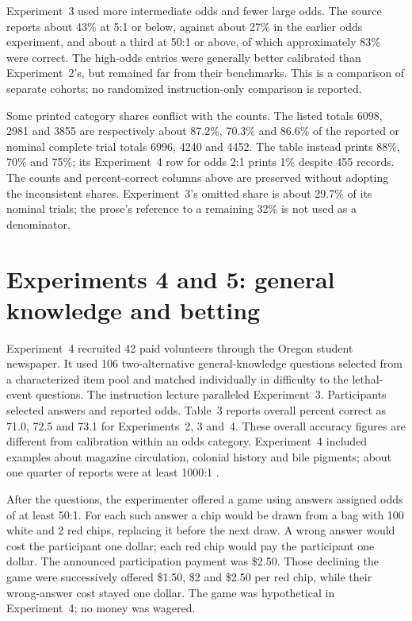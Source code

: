 Experiment~3 used more intermediate odds and fewer large odds. The source
reports about 43\% at 5:1 or below, against about 27\% in the earlier
odds experiment, and about a third at 50:1 or above, of which approximately
83\% were correct. The high-odds entries were generally better calibrated
than Experiment~2's, but remained far from their benchmarks. This is a
comparison of separate cohorts; no randomized instruction-only comparison
is reported.

Some printed category shares conflict with the counts. The listed totals
6098, 2981 and 3855 are respectively about 87.2\%, 70.3\% and 86.6\%
of the reported or nominal complete trial totals 6996, 4240 and 4452.
The table instead prints 88\%, 70\% and 75\%; its Experiment~4 row
for odds 2:1 prints 1\% despite 455 records. The counts and percent-correct
columns above are preserved without adopting the inconsistent shares.
Experiment~3's omitted share is about 29.7\% of its nominal trials;
the prose's reference to a remaining 32\% is not used as a denominator.

\section{Experiments 4 and 5: general knowledge and betting}
\label{sec:p19-certainty-betting-experiments}

Experiment~4 recruited 42 paid volunteers through the Oregon student
newspaper. It used 106 two-alternative general-knowledge questions selected
from a characterized item pool and matched individually in difficulty to
the lethal-event questions. The instruction lecture paralleled Experiment~3.
Participants selected answers and reported odds. Table~3 reports overall
percent correct as 71.0, 72.5 and 73.1 for Experiments~2, 3 and~4.
These overall accuracy figures are different from calibration within an
odds category. Experiment~4 included examples about magazine circulation,
colonial history and bile pigments; about one quarter of reports were at
least 1000:1 \cite[pp.~557--558]{FischhoffSlovicLichtenstein1977Certainty}.

After the questions, the experimenter offered a game using answers assigned
odds of at least 50:1. For each such answer a chip would be drawn from a
bag with 100 white and 2 red chips, replacing it before the next draw.
A wrong answer would cost the participant one dollar; each red chip would
pay the participant one dollar. The announced participation payment was
\$2.50. Those declining the game were successively offered \$1.50, \$2
and \$2.50 per red chip, while their wrong-answer cost stayed one dollar.
The game was hypothetical in Experiment~4; no money was wagered.

